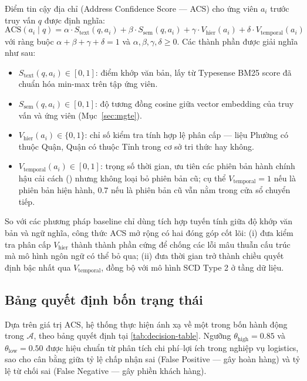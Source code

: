 Điểm tin cậy địa chỉ (Address Confidence Score --- ACS) cho ứng viên $a_i$ trước truy vấn $q$ được định nghĩa:
\begin{equation}
\mathrm{ACS}(a_i \mid q) = \alpha \cdot S_{\text{text}}(q, a_i) + \beta \cdot S_{\text{sem}}(q, a_i) + \gamma \cdot V_{\text{hier}}(a_i) + \delta \cdot V_{\text{temporal}}(a_i)
\label{eq:acs}
\end{equation}
với ràng buộc $\alpha + \beta + \gamma + \delta = 1$ và $\alpha, \beta, \gamma, \delta \geq 0$. Các thành phần được giải nghĩa như sau:
\begin{itemize}[leftmargin=*]
\item $S_{\text{text}}(q, a_i) \in [0, 1]$: điểm khớp văn bản, lấy từ Typesense BM25 score đã chuẩn hóa min-max trên tập ứng viên.
\item $S_{\text{sem}}(q, a_i) \in [0, 1]$: độ tương đồng cosine giữa vector embedding của truy vấn và ứng viên (Mục~\ref{sec:mgte}).
\item $V_{\text{hier}}(a_i) \in \{0, 1\}$: chỉ số kiểm tra tính hợp lệ phân cấp --- liệu Phường có thuộc Quận, Quận có thuộc Tỉnh trong cơ sở tri thức  hay không.
\item $V_{\text{temporal}}(a_i) \in [0, 1]$: trọng số thời gian, ưu tiên các phiên bản hành chính hậu cải cách () nhưng không loại bỏ phiên bản cũ; cụ thể $V_{\text{temporal}} = 1$ nếu là phiên bản hiện hành, $0.7$ nếu là phiên bản cũ vẫn nằm trong cửa sổ chuyển tiếp.
\end{itemize}

So với các phương pháp baseline chỉ dùng tích hợp tuyến tính giữa độ khớp văn bản và ngữ nghĩa, công thức ACS mở rộng có hai đóng góp cốt lõi: (i) đưa kiểm tra phân cấp $V_{\text{hier}}$ thành thành phần cứng để chống các lỗi mâu thuẫn cấu trúc mà mô hình ngôn ngữ có thể bỏ qua; (ii) đưa thời gian trở thành chiều quyết định bậc nhất qua $V_{\text{temporal}}$, đồng bộ với mô hình SCD Type 2 ở tầng dữ liệu.

\subsection{Bảng quyết định bốn trạng thái}

Dựa trên giá trị ACS, hệ thống thực hiện ánh xạ về một trong bốn hành động trong $\mathcal{A}$, theo bảng quyết định tại \cref{tab:decision-table}. Ngưỡng $\theta_{\text{high}} = 0.85$ và $\theta_{\text{low}} = 0.50$ được hiệu chuẩn từ phân tích chi phí--lợi ích trong nghiệp vụ logistics, sao cho cân bằng giữa tỷ lệ chấp nhận sai (False Positive --- gây hoàn hàng) và tỷ lệ từ chối sai (False Negative --- gây phiền khách hàng).

